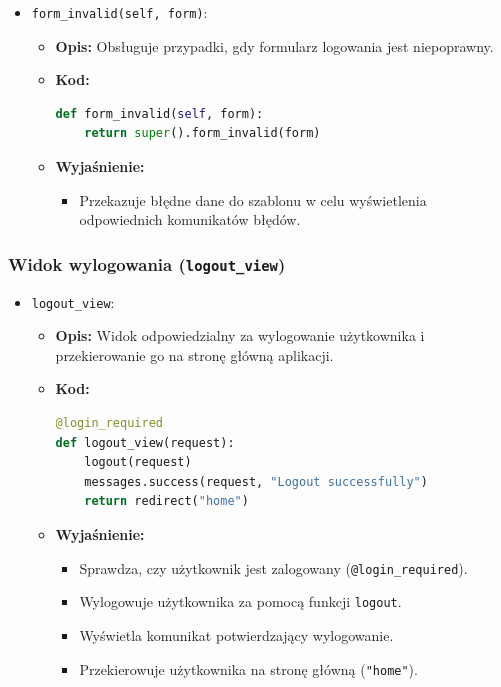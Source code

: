 \documentclass[12pt,a4paper,oneside]{article}
\theoremstyle{definition}
\numberwithin{equation}{section}
\begin{document}
\begin{itemize}
    \item \texttt{form\_invalid(self, form)}:
    \begin{itemize}
        \item \textbf{Opis:} Obsługuje przypadki, gdy formularz logowania jest niepoprawny.
        \item \textbf{Kod:}
        \begin{lstlisting}[language=Python, caption=Metoda \texttt{form\_invalid} w UserLoginView]
def form_invalid(self, form):
    return super().form_invalid(form)
        \end{lstlisting}
        \item \textbf{Wyjaśnienie:}
        \begin{itemize}
            \item Przekazuje błędne dane do szablonu w celu wyświetlenia odpowiednich komunikatów błędów.
        \end{itemize}
    \end{itemize}
\end{itemize}

\subsubsection*{Widok wylogowania (\texttt{logout\_view})}
\begin{itemize}
    \item \texttt{logout\_view}:
    \begin{itemize}
        \item \textbf{Opis:} Widok odpowiedzialny za wylogowanie użytkownika i przekierowanie go na stronę główną aplikacji.
        \item \textbf{Kod:}
        \begin{lstlisting}[language=Python, caption=Widok \texttt{logout\_view}]
@login_required
def logout_view(request):
    logout(request)
    messages.success(request, "Logout successfully")
    return redirect("home")
        \end{lstlisting}
        \item \textbf{Wyjaśnienie:}
        \begin{itemize}
            \item Sprawdza, czy użytkownik jest zalogowany (\texttt{@login\_required}).
            \item Wylogowuje użytkownika za pomocą funkcji \texttt{logout}.
            \item Wyświetla komunikat potwierdzający wylogowanie.
            \item Przekierowuje użytkownika na stronę główną (\texttt{"home"}).
        \end{itemize}
    \end{itemize}
\end{itemize}
\end{document}
